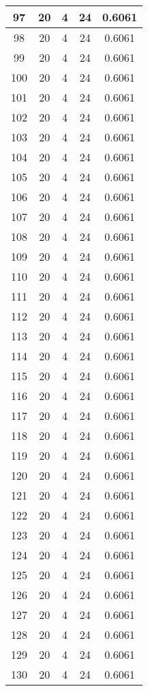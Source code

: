\documentclass[letterpaper, 12pt]{article}
\begin{document}
\begin{longtable}{|c|c|c|c|c|}
\hline
97 & 20 & 4 & 24 & 0.6061 \\
\hline
98 & 20 & 4 & 24 & 0.6061 \\
\hline
99 & 20 & 4 & 24 & 0.6061 \\
\hline
100 & 20 & 4 & 24 & 0.6061 \\
\hline
101 & 20 & 4 & 24 & 0.6061 \\
\hline
102 & 20 & 4 & 24 & 0.6061 \\
\hline
103 & 20 & 4 & 24 & 0.6061 \\
\hline
104 & 20 & 4 & 24 & 0.6061 \\
\hline
105 & 20 & 4 & 24 & 0.6061 \\
\hline
106 & 20 & 4 & 24 & 0.6061 \\
\hline
107 & 20 & 4 & 24 & 0.6061 \\
\hline
108 & 20 & 4 & 24 & 0.6061 \\
\hline
109 & 20 & 4 & 24 & 0.6061 \\
\hline
110 & 20 & 4 & 24 & 0.6061 \\
\hline
111 & 20 & 4 & 24 & 0.6061 \\
\hline
112 & 20 & 4 & 24 & 0.6061 \\
\hline
113 & 20 & 4 & 24 & 0.6061 \\
\hline
114 & 20 & 4 & 24 & 0.6061 \\
\hline
115 & 20 & 4 & 24 & 0.6061 \\
\hline
116 & 20 & 4 & 24 & 0.6061 \\
\hline
117 & 20 & 4 & 24 & 0.6061 \\
\hline
118 & 20 & 4 & 24 & 0.6061 \\
\hline
119 & 20 & 4 & 24 & 0.6061 \\
\hline
120 & 20 & 4 & 24 & 0.6061 \\
\hline
121 & 20 & 4 & 24 & 0.6061 \\
\hline
122 & 20 & 4 & 24 & 0.6061 \\
\hline
123 & 20 & 4 & 24 & 0.6061 \\
\hline
124 & 20 & 4 & 24 & 0.6061 \\
\hline
125 & 20 & 4 & 24 & 0.6061 \\
\hline
126 & 20 & 4 & 24 & 0.6061 \\
\hline
127 & 20 & 4 & 24 & 0.6061 \\
\hline
128 & 20 & 4 & 24 & 0.6061 \\
\hline
129 & 20 & 4 & 24 & 0.6061 \\
\hline
130 & 20 & 4 & 24 & 0.6061 \\

\end{longtable}
\end{document}
